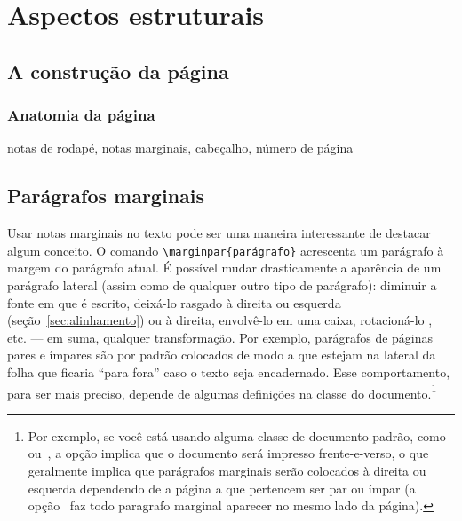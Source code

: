 \section{Aspectos estruturais}

\subsection{A construção da página}
\subsubsection{Anatomia da página}

notas de rodapé, notas marginais, cabeçalho, número de página

\subsection{Parágrafos marginais}
\newcommand{\amounttorotate}{0}
Usar  notas
marginais no texto pode ser uma maneira interessante de destacar algum
conceito. O comando \verb'\marginpar{parágrafo}' acrescenta um
parágrafo à margem do parágrafo atual. É possível mudar drasticamente
a aparência de um parágrafo lateral (assim como de qualquer outro tipo
de parágrafo): diminuir a fonte em que é escrito, deixá-lo rasgado à
direita ou esquerda (seção~\ref{sec:alinhamento}) ou à direita,
envolvê-lo em uma caixa,
rotacioná-lo%
\marginpar{%
  \ifthenelse{\isodd{\thepage}}%
             {\raggedleft\renewcommand{\amounttorotate}{90}}%
             {\raggedright\renewcommand{\amounttorotate}{-90}}%
  \rotatebox{\amounttorotate}{\footnotesize\it $\mathcal{A}$ssim.}},
etc. --- em suma, qualquer transformação. Por exemplo, parágrafos de
páginas pares e ímpares são por padrão colocados de modo a que estejam
na lateral da folha que ficaria ``para fora'' caso o texto seja
encadernado. Esse comportamento, para ser mais preciso, depende de
algumas definições na classe do documento.\footnote{Por exemplo, se
  você está usando alguma  classe de documento padrão,
  como~ ou~, a opção
   implica que o documento será impresso
  frente-e-verso, o que geralmente implica que parágrafos marginais
  serão colocados à direita ou esquerda dependendo de a página a que
  pertencem ser par ou ímpar (a opção~ faz todo
  paragrafo marginal aparecer no mesmo lado da página).}

